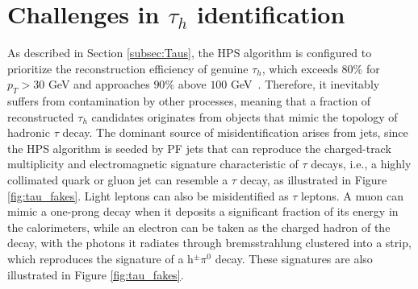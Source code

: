 \section{Challenges in \texorpdfstring{$\tau_h$}{τh} identification}
\label{sec:Tau_MisID}
%
As described in Section \ref{subsec:Taus}, the HPS algorithm is configured to prioritize the reconstruction efficiency of genuine $\tau_h$, which exceeds $80\%$ for $p_T > 30$ GeV and approaches $90\%$ above $100$ GeV~\cite{CMS-TAU-20-001}. Therefore, it inevitably suffers from contamination by other processes, meaning that a fraction of reconstructed $\tau_h$ candidates originates from objects that mimic the topology of hadronic $\tau$ decay. The dominant source of misidentification arises from jets, since the HPS algorithm is seeded by PF jets that can reproduce the charged-track multiplicity and electromagnetic signature characteristic of $\tau$ decays, i.e., a highly collimated quark or gluon jet can resemble a $\tau$ decay, as illustrated in Figure \ref{fig:tau_fakes}. Light leptons can also be misidentified as $\tau$ leptons. A muon can mimic a one-prong decay when it deposits a significant fraction of its energy in the calorimeters, while an electron can be taken as the charged hadron of the decay, with the photons it radiates through bremsstrahlung clustered into a strip, which reproduces the signature of a h$^{\pm}\pi^0$ decay. These signatures are also illustrated in Figure \ref{fig:tau_fakes}.
%
